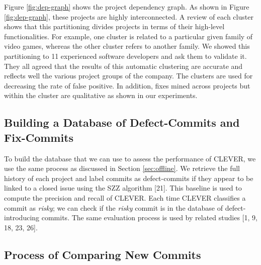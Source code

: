 \documentclass[sigconf]{acmart}
\begin{document}
Figure \ref{fig:dep-graph} shows the project dependency graph. As shown
in Figure \ref{fig:dep-graph}, these projects are highly interconnected.
A review of each cluster shows that this partitioning divides projects
in terms of their high-level functionalities. For example, one cluster
is related to a particular given family of video games, whereas the
other cluster refers to another family. We showed this partitioning to
11 experienced software developers and ask them to validate it. They all
agreed that the results of this automatic clustering are accurate and
reflects well the various project groups of the company. The clusters
are used for decreasing the rate of false positive. In addition, fixes
mined across projects but within the cluster are qualitative as shown in
our experiments.

\subsection{Building a Database of Defect-Commits and
Fix-Commits}\label{sub:golden}

To build the database that we can use to assess the performance of
CLEVER, we use the same process as discussed in Section
\ref{sec:offline}. We retrieve the full history of each project and
label commits as defect-commits if they appear to be linked to a closed
issue using the SZZ algorithm [21]. This baseline is used to compute
the precision and recall of CLEVER. Each time CLEVER classifies a commit
as \emph{risky}; we can check if the \emph{risky} commit is in the
database of defect-introducing commits. The same evaluation process is
used by related studies [1, 9, 18, 23, 26].

\subsection{Process of Comparing New Commits}\label{sec:newcommits}


\end{document}
